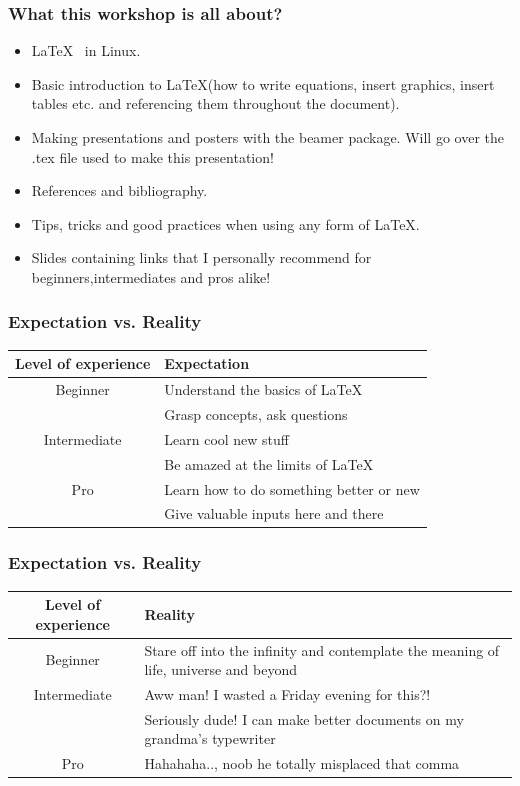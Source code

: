 \documentclass[xcolor=svgnames]{beamer}
\begin{document}
\begin{frame}
    \frametitle{What this workshop is all about?}
    \begin{itemize}
        \item \LaTeX~ in Linux.
        \item Basic introduction to \LaTeX (how to write equations, insert graphics, insert tables etc. and referencing them throughout the document).
        \item Making presentations and posters with the beamer package. Will go over the .tex file used to make this presentation!
        \item References and bibliography.
        \item Tips, tricks and good practices when using any form of \LaTeX.
        \item Slides containing links that I personally recommend for beginners,intermediates and pros alike!
    \end{itemize}
\end{frame}
\begin{frame}
    \frametitle{Expectation vs. Reality}
    \begin{table}
        \begin{tabular}{ |c||m{8cm}| }
            \hline
            Level of experience & Expectation\\
            \hline
            Beginner & Understand the basics of \LaTeX\\
                     & Grasp concepts, ask questions\\
            \hline
            Intermediate & Learn cool new stuff\\
                         & Be amazed at the limits of \LaTeX\\
            \hline
            Pro & Learn how to do something better or new\\
                & Give valuable inputs here and there\\
            \hline
        \end{tabular}
    \end{table}
\end{frame}
\begin{frame}
    \frametitle{Expectation vs. Reality}
    \begin{table}
        \begin{tabular}{ |c||m{8cm}| }
            \hline
            Level of experience & Reality\\
            \hline
            Beginner & Stare off into the infinity and contemplate the meaning of life, universe and beyond\\
            \hline
            Intermediate & Aww man! I wasted a Friday evening for this?!\\
                         & Seriously dude! I can make better documents on my grandma's typewriter\\
            \hline
            Pro & Hahahaha.., noob he totally misplaced that comma\\
            \hline
        \end{tabular}
    \end{table}
\end{frame}
\end{document}
